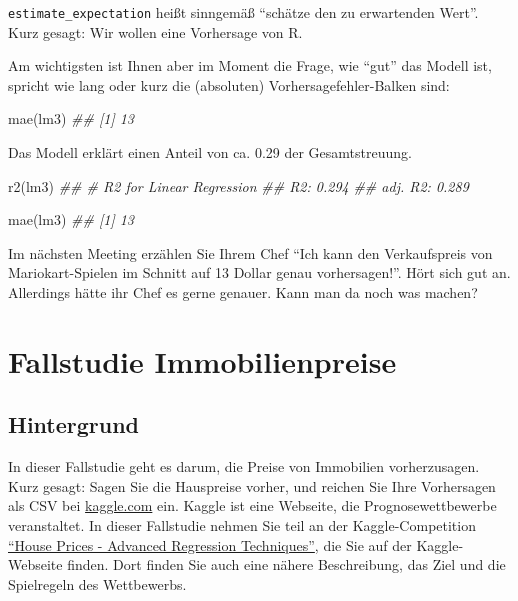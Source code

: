 \documentclass[
  letterpaper,
  oneside,
  open=any]{scrbook}
\newenvironment{Shaded}{\begin{snugshade}}{\end{snugshade}}
\newcommand{\DocumentationTok}[1]{\textcolor[rgb]{0.37,0.37,0.37}{\textit{#1}}}
\newcommand{\FunctionTok}[1]{\textcolor[rgb]{0.28,0.35,0.67}{#1}}
\newcommand{\NormalTok}[1]{\textcolor[rgb]{0.00,0.23,0.31}{#1}}
\theoremstyle{definition}
\theoremstyle{definition}
\theoremstyle{definition}
\theoremstyle{remark}
\begin{document}
\texttt{estimate\_expectation} heißt sinngemäß \enquote{schätze den zu
erwartenden Wert}. Kurz gesagt: Wir wollen eine Vorhersage von R.

Am wichtigsten ist Ihnen aber im Moment die Frage, wie \enquote{gut} das
Modell ist, spricht wie lang oder kurz die (absoluten)
Vorhersagefehler-Balken sind:

\begin{Shaded}
\begin{Highlighting}[]
\FunctionTok{mae}\NormalTok{(lm3)}
\DocumentationTok{\#\# [1] 13}
\end{Highlighting}
\end{Shaded}

Das Modell erklärt einen Anteil von ca. 0.29 der Gesamtstreuung.

\begin{Shaded}
\begin{Highlighting}[]
\FunctionTok{r2}\NormalTok{(lm3)}
\DocumentationTok{\#\# \# R2 for Linear Regression}
\DocumentationTok{\#\#        R2: 0.294}
\DocumentationTok{\#\#   adj. R2: 0.289}
\end{Highlighting}
\end{Shaded}

\begin{Shaded}
\begin{Highlighting}[]
\FunctionTok{mae}\NormalTok{(lm3)}
\DocumentationTok{\#\# [1] 13}
\end{Highlighting}
\end{Shaded}

Im nächsten Meeting erzählen Sie Ihrem Chef \enquote{Ich kann den
Verkaufspreis von Mariokart-Spielen im Schnitt auf 13 Dollar genau
vorhersagen!}. Hört sich gut an. Allerdings hätte ihr Chef es gerne
genauer. Kann man da noch was machen?

\section{Fallstudie Immobilienpreise}\label{fallstudie-immobilienpreise}

\subsection{Hintergrund}\label{hintergrund}

In dieser Fallstudie geht es darum, die Preise von Immobilien
vorherzusagen. Kurz gesagt: Sagen Sie die Hauspreise vorher, und reichen
Sie Ihre Vorhersagen als CSV bei
\href{https://www.kaggle.com/}{kaggle.com} ein. Kaggle ist eine
Webseite, die Prognosewettbewerbe veranstaltet. In dieser Fallstudie
nehmen Sie teil an der Kaggle-Competition
\href{https://www.kaggle.com/competitions/house-prices-advanced-regression-techniques/overview}{\enquote{House
Prices - Advanced Regression Techniques}}, die Sie auf der
Kaggle-Webseite finden. Dort finden Sie auch eine nähere Beschreibung,
das Ziel und die Spielregeln des Wettbewerbs.
\end{document}
